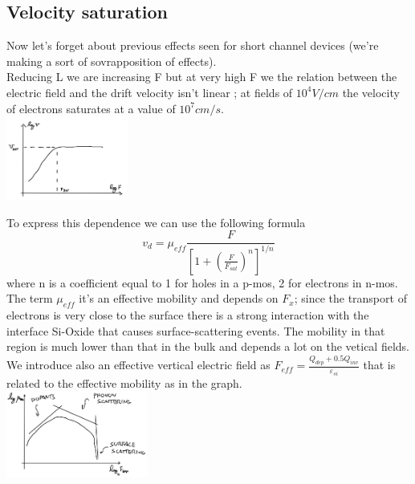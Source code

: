 \subsection{Velocity saturation}
Now let's forget about previous effects seen for short channel devices (we're making a sort of sovrapposition of effects).\\
Reducing L we are increasing F but at very high F we the relation between the electric field and the drift velocity isn't linear ; at fields of $10^4 V/cm$ the velocity of electrons saturates at a value of $10^7 cm/s$.\\

\centering
\includegraphics[width=0.3\textwidth]{satvel.png}\\
\raggedright

To express this dependence we can use the following formula 
\begin{equation}
v_d=\mu_{eff}\frac{F}{[1+\left(\frac{F}{F_{sat}}\right)^n]^{1/n}}
\end{equation}
where n is a coefficient equal to 1 for holes in a p-mos, 2 for electrons in n-mos.\\ 
The term $\mu_{eff}$ it's an effective mobility and depends on $F_x$; since the transport of electrons is very close to the surface there is a strong interaction with the interface Si-Oxide that causes surface-scattering events. The mobility in that region is much lower than that in the bulk and depends a lot on the vetical fields. We introduce also an effective vertical electric field as $F_{eff}=\frac{Q_{dep}+0.5Q_{inv}}{\varepsilon_{si}}$ that is related to the effective mobility as in the graph.\\

\centering
\includegraphics[width=0.35\textwidth]{muefff.png}\\
\raggedright


